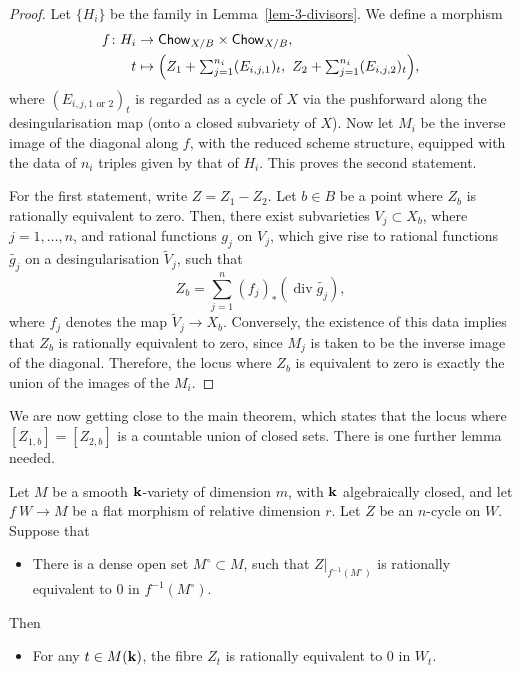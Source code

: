 \begin{proof}
    Let $\{ H_i \}$ be the family in Lemma~\ref{lem-3-divisors}. We define a morphism
    \[ \begin{aligned}
        f \colon H_i & \to     \textsf{\textup{Chow}}_{X/B} \times \textsf{\textup{Chow}}_{X/B}, \\
               t & \mapsto \textstyle \Bigl( Z_1 + \sum_{j=1}^{n_i} (E_{i,j,1})_t, \ Z_2 + \sum_{j=1}^{n_i} (E_{i,j,2})_t \Bigr),
    \end{aligned} \]
    where $(E_{i,j,1 \text{ or } 2})_t$ is regarded as a cycle of $X$
    via the pushforward along the desingularisation map (onto a closed subvariety of $X$).
    Now let $M_i$ be the inverse image of the diagonal along $f$,
    with the reduced scheme structure,
    equipped with the data of $n_i$ triples given by that of $H_i$.
    This proves the second statement.

    For the first statement, write $Z = Z_1 - Z_2$.
    Let $b \in B$ be a point where $Z_b$ is rationally equivalent to zero.
    Then, there exist subvarieties $V_j \subset X_b$, where $j = 1, \dotsc, n$,
    and rational functions $g_j$ on $V_j$, which give rise to
    rational functions $\widetilde{g_j}$ on a desingularisation $\widetilde{V}_j$,
    such that
    \[ \textstyle Z_b = \sum_{j=1}^n (f_j)_* (\operatorname{div} \widetilde{g_j}), \]
    where $f_j$ denotes the map $\widetilde{V}_j \to X_b$.
    Conversely, the existence of this data implies that $Z_b$ is rationally equivalent to zero,
    since $M_j$ is taken to be the inverse image of the diagonal.
    Therefore, the locus where $Z_b$ is equivalent to zero
    is exactly the union of the images of the $M_i$.
\end{proof}

We are now getting close to the main theorem,
which states that the locus where $[Z_{1,b}] = [Z_{2,b}]$
is a countable union of closed sets.
There is one further lemma needed.

\begin{lemma} \label{lem-3-specialise}
    Let $M$ be a smooth $\bbk$-variety of dimension $m$, with $\bbk$ algebraically closed,
    and let $f \: W \to M$ be a flat morphism of relative dimension $r$.
    Let $Z$ be an $n$-cycle on $W$. Suppose that
    \begin{itemize}
        \item
            There is a dense open set $M^\circ \subset M$,
            such that $Z|_{f^{-1} (M^\circ)}$ is rationally equivalent to $0$ in $f^{-1} (M^\circ)$.
    \end{itemize}
    Then
    \begin{itemize}
        \item
            For any $t \in M (\bbk)$,
            the fibre $Z_t$ is rationally equivalent to $0$ in $W_t$.
    \end{itemize}
\end{lemma}

